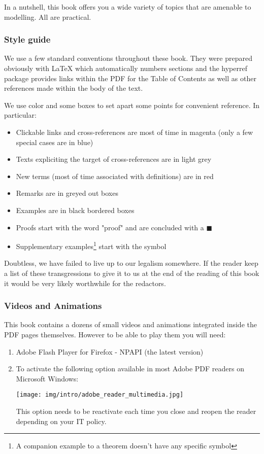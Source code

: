 	In a nutshell, this book offers you a wide variety of topics that are amenable to modelling. All are practical.
	
	\subsubsection{Style guide}
	We use a few standard conventions throughout these book. They were prepared  obviously with \LaTeX{} which automatically numbers sections and the hyperref package provides links within the PDF for the Table of Contents as well as other references made within the body of the text.

	We use color and some boxes to set apart some points for convenient reference. In particular:
	\begin{itemize}
		\item Clickable links and cross-references are most of time in magenta (only a few special cases are in blue)
		
		\item Texts expliciting the target of cross-references are in light grey 
		
		\item New terms (most of time associated with definitions) are in red
		
		\item Remarks are in greyed out boxes
		
		\item Examples are in black bordered boxes
		
		\item Proofs start with the word "proof" and are concluded with a $\blacksquare$
		
		\item Supplementary examples\footnote{A companion example to a theorem doesn't have any specific symbol} start with the symbol {\Large {}}
	\end{itemize}
	Doubtless, we have failed to live up to our legalism somewhere. If the reader keep a list of these transgressions to give it to us at the end of the reading of this book it would be very likely worthwhile for the redactors.
	
	\subsubsection{Videos and Animations}
	This book contains a dozens of small videos and animations integrated inside the PDF pages themselves. However to be able to play them you will need:
	\begin{enumerate}
		\item Adobe Flash Player for Firefox - NPAPI (the latest version)
		
		\item To activate the following option available in most Adobe PDF readers on Microsoft Windows:
		\begin{center}
			\texttt{[image: img/intro/adobe\_reader\_multimedia.jpg]}
		\end{center}
		This option needs to be reactivate each time you close and reopen the reader depending on your IT policy.
	\end{enumerate}
	
